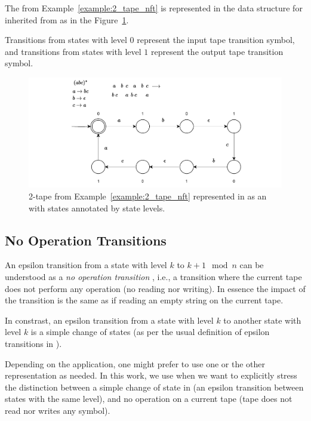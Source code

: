 



\begin{example}\label{example:2_tape_nft_in_mata}
  The \nft from Example~\ref{example:2_tape_nft} is represented in the data structure for \nfts inherited from \nfaClass as in the Figure~\ref{fig:2_tape_nft_in_mata}.

  Transitions from states with level $0$ represent the input tape transition symbol, and transitions from states with level $1$ represent the output tape transition symbol.

  \begin{figure}[ht]
    \centering
    \includegraphics[scale=1.0,keepaspectratio]{obrazky-figures/transducer_in_mata.drawio.pdf}
    \caption{
      2-tape \nft from Example~\ref{example:2_tape_nft} represented in \mata as an \nfaClass with states annotated by state levels.
    }\label{fig:2_tape_nft_in_mata}
  \end{figure}
\end{example}

\subsection{No Operation Transitions}
An epsilon transition from a state with level $k$ to $k+1 \mod n$ can be understood as a \emph{no operation transition} \nop, i.e., a transition where the current tape does not perform any operation (no reading nor writing). In essence the impact of the transition is the same as if reading an empty string on the current tape.

In constrast, an epsilon transition from a state with level $k$ to another state with level $k$ is a simple change of states (as per the usual definition of epsilon transitions in \nfas).

Depending on the application, one might prefer to use one or the other representation as needed.
In this work, we use \nop when we want to explicitly stress the distinction between a simple change of state in \nft (an epsilon transition between states with the same level), and no operation on a current tape (tape does not read nor writes any symbol).

